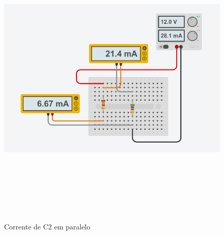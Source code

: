 \documentclass[
		12pt, %
		oneside, %
		a4paper, %
		article, %
		chapter=TITLE, %
		section=TITLE, %
		subsection=TITLE, %
		english, %
		spanish, %
		brazil %
]{abntex2} %
\numberwithin{equation}{section}
\numberwithin{figure}{section}
\numberwithin{table}{section}
\begin{document}
	\begin{figure}[h]
		\graphicspath{ {./esquematicos/} }

		\caption{Corrente de C2 em paralelo}
		\includegraphics[width=15cm, height=14cm]{C2_P-C.png}
		\label{fig:figura4}

	\end{figure}
\end{document}
